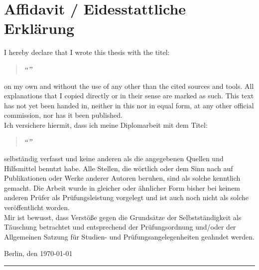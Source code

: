 \chapter{Affidavit / Eidesstattliche Erklärung}
\label{affidavit}

I hereby declare that I wrote this thesis with the titel:
\begin{quote}
\textit{\textbf{``\titel''}}
\end{quote}
on my own and without the use of any other than the cited sources and tools.
All explanations that I copied directly or in their sense are marked as such.
This text has not yet been handed in, neither in this nor in equal form, at any other official commission, nor has it been published.\\[1ex]

Ich versichere hiermit, dass ich meine Diplomarbeit mit dem Titel:
\begin{quote}
\textit{\textbf{``\titel''}}
\end{quote}
selbständig verfasst und keine anderen als die angegebenen Quellen und Hilfsmittel benutzt habe.
Alle Stellen, die wörtlich oder dem Sinn nach auf Publikationen oder Werke anderer Autoren beruhen, sind als solche kenntlich gemacht.
Die Arbeit wurde in gleicher oder ähnlicher Form bisher bei keinem anderen Prüfer als Prüfungsleistung vorgelegt und ist auch noch nicht als solche veröffentlicht worden.\\
Mir ist bewusst, dass Verstöße gegen die Grundsätze der Selbstständigkeit als Täuschung betrachtet und entsprechend der Prüfungsordnung und/oder der Allgemeinen Satzung für Studien- und Prüfungsangelegenheiten geahndet werden.
\vspace*{2ex}


\begin{flushright}
Berlin, den \today \\[10ex]
\rule[-0.25cm]{8cm}{0.5pt} \\
\textit{\autor} \hspace*{0.1cm}
\end{flushright}
